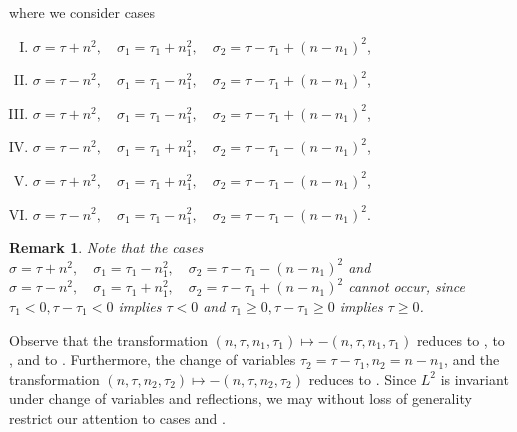 \documentclass[12pt,reqno]{amsart}
\numberwithin{equation}{section}  %
\newtheorem{remark}[theorem]{Remark}
\begin{document}
%
%
%
where we consider cases
\begin{enumerate}[(I)]
    \item{} $ \sigma=\tau+n^2,\quad \sigma_1=\tau_1+n_1^2,\quad \sigma_2=\tau -
      \tau_1+(n - n_1)^2$,
\label{it-1}
    \item{} $ \sigma=\tau-n^2,\quad \sigma_1=\tau_1-n_1^2,\quad \sigma_2=\tau - \tau_1+(n - n_1)^2$,
\label{it-2}
    \item{}  $\sigma=\tau+n^2,\quad \sigma_1=\tau_1-n_1^2,\quad \sigma_2=\tau - \tau_1+(n - n_1)^2$,
      \label{it-3}
    \item{} $\sigma=\tau-n^2,\quad \sigma_1=\tau_1+n_1^2,\quad \sigma_2=\tau - \tau_1-(n - n_1)^2$,
\label{it-4}
    \item{} $\sigma=\tau+n^2,\quad \sigma_1=\tau_1+n_1^2,\quad \sigma_2=\tau - \tau_1-(n - n_1)^2$,
\label{it-5}
    \item{} $\sigma=\tau-n^2,\quad \sigma_1=\tau_1-n_1^2,\quad \sigma_2=\tau - \tau_1-(n - n_1)^2$.
\label{it-6}
\end{enumerate}
%
%
%
\begin{framed}
\begin{remark}
Note that the cases $\sigma=\tau+n^2,\quad \sigma_1=\tau_1-n_1^2,\quad
\sigma_2=\tau - \tau_1-(n - n_1)^2$ and $\sigma=\tau-n^2,\quad
\sigma_1=\tau_1+n_1^2,\quad \sigma_2=\tau - \tau_1+(n - n_1)^2$ cannot occur, since
$\tau_1< 0, \tau-\tau_1< 0$ implies $\tau<0$ and $\tau_1\geq 0, \tau-\tau_1\geq
0$ implies $\tau\geq 0$. 
\end{remark}
\end{framed}
%
%
%
%
%
Observe that the transformation $(n, \tau, n_{1}, \tau_{1}) \mapsto -(n, \tau,
n_{1}, \tau_{1})$ reduces  to ,  to
, and  to . Furthermore, the change of
variables $\tau_{2} = \tau - \tau_{1}, n_{2} = n - n_{1}$, and the
transformation $(n, \tau, n_{2}, \tau_{2}) \mapsto - (n, \tau, n_{2},
\tau_{2})$ reduces  to . Since $L^{2}$ is invariant
under change of variables and reflections, we may without loss of generality
restrict our attention to cases  and .
\end{document}
